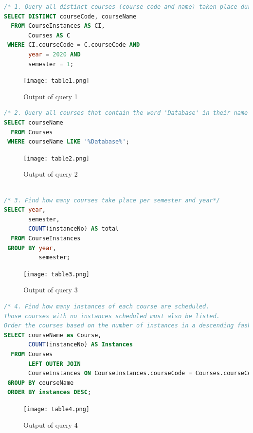 \documentclass{article}
\begin{document}
\begin{lstlisting}[language=SQL]
/* 1. Query all distinct courses (course code and name) taken place during the first semester of 2020 */
SELECT DISTINCT courseCode, courseName
  FROM CourseInstances AS CI,
       Courses AS C
 WHERE CI.courseCode = C.courseCode AND 
       year = 2020 AND 
       semester = 1;
\end{lstlisting}

\begin{figure}[!h]
	\centering
	\texttt{[image: table1.png]}
	\caption{Output of query 1}
	\label{fig:1}
\end{figure}

\begin{lstlisting}[language=SQL]
/* 2. Query all courses that contain the word 'Database' in their name */
SELECT courseName
  FROM Courses
 WHERE courseName LIKE '%Database%';

\end{lstlisting}

\begin{figure}[!h]
	\centering
	\texttt{[image: table2.png]}
	\caption{Output of query 2}
	\label{fig:2}
\end{figure}

\begin{lstlisting}[language=SQL]

/* 3. Find how many courses take place per semester and year*/
SELECT year,
       semester,
       COUNT(instanceNo) AS total
  FROM CourseInstances
 GROUP BY year,
          semester;
\end{lstlisting}

\begin{figure}[!h]
	\centering
	\texttt{[image: table3.png]}
	\caption{Output of query 3}
	\label{fig:3}
\end{figure}

\begin{lstlisting}[language=SQL]
/* 4. Find how many instances of each course are scheduled.
Those courses with no instances scheduled must also be listed.
Order the courses based on the number of instances in a descending fashion. */
SELECT courseName as Course,
       COUNT(instanceNo) AS Instances
  FROM Courses
       LEFT OUTER JOIN
       CourseInstances ON CourseInstances.courseCode = Courses.courseCode
 GROUP BY courseName
 ORDER BY instances DESC;
\end{lstlisting}

\begin{figure}[!h]
	\centering
	\texttt{[image: table4.png]}
	\caption{Output of query 4}
	\label{fig:4}
\end{figure}
\end{document}
